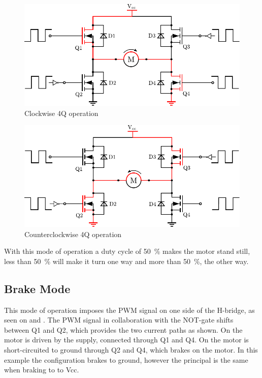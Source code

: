   \begin{minipage}{\linewidth}
  	\centering
  	\begin{minipage}{0.45\linewidth}
  		\begin{figure}[H]
  			\centering
  			\includegraphics[scale=.53]{figures/HbridgeClockwise4Q.pdf}
  			\caption{Clockwise 4Q operation}
  			\label{HbridgeClokwise4Q}
  		\end{figure}
  	\end{minipage}
  	\hspace{0.03\linewidth}
  	\begin{minipage}{0.45\linewidth}
  		\begin{figure}[H]
  			\centering
  			\includegraphics[scale=.53]{figures/HbridgeCounterClockwise4Q.pdf}
  			\caption{Counterclockwise 4Q operation}
  			\label{HbridgeCounterClokwise4Q}
  		\end{figure}
  	\end{minipage}
  \end{minipage}

With this mode of operation a duty cycle of \si{50 \%} makes the motor stand still, less than \si{50 \%} will make it turn one way and more than \si{50 \%}, the other way.

\subsection{Brake Mode}
This mode of operation imposes the PWM signal on one side of the H-bridge, as seen on  and . The PWM signal in collaboration with the NOT-gate shifts between Q1 and Q2, which provides the two current paths as shown. On  the motor is driven by the supply, connected through Q1 and Q4. On  the motor is short-circuited to ground through Q2 and Q4, which brakes on the motor. In this example the configuration brakes to ground, however the principal is the same when braking to to Vcc.

